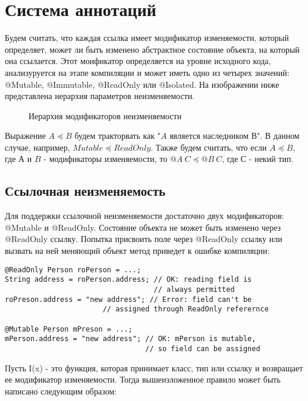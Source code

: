 \section{Система аннотаций}

Будем считать, что каждая ссылка имеет модификатор изменяемости, который определяет, может ли быть изменено абстрактное состояние объекта, на который она ссылается. Этот моификатор определяется на уровне исходного кода, анализуруется на этапе компиляции и может иметь одно из четырех значений: @Mutable, @Immutable, @ReadOnly или @Isolated. На изображении ниже представлена иерархия параметров неизменяемости. 

\begin{figure}[h]
\caption{Иерархия модификаторов неизменяемости}
\label{pic:my_classes}
\end{figure}

Выражение $A \preceq B$ будем тракторвать как "$A$ является наследником $В$". В данном случае, например, $Mutable \preceq ReadOnly$. Также будем считать, что если $A \preceq B$, где $А$ и $B$ - модификаторы изменяемости, то $@A\:C \preceq @B\:C$, где $С$ - некий тип.

\subsection{Ссылочная неизменяемость}

Для поддержки ссылочной неизменяемости достаточно двух модификаторов: @Mutable и @ReadOnly. Состояние объекта не может быть изменено через @ReadOnly ссылку. Попытка присвоить поле через @ReadOnly ссылку или вызвать на ней меняющий объект метод приведет к ошибке компиляции:

\begin{lstlisting}[caption=Mutable и RadOnly ссылки, label=code:mutable_vs_readonly]
@ReadOnly Person roPerson = ...;
String address = roPerson.address; // OK: reading field is 
                                   // always permitted
roPreson.address = "new address"; // Error: field can't be 
                       // assigned through ReadOnly referernce

@Mutable Person mPreson = ...;
mPerson.address = "new address"; // OK: mPerson is mutable, 
                                 // so field can be assigned
\end{lstlisting} 

Пусть I(x) - это функция, которая принимает класс, тип или ссылку и возвращает ее модификатор изменяемости. Тогда вышеизложенное правило может быть написано следующим образом:

